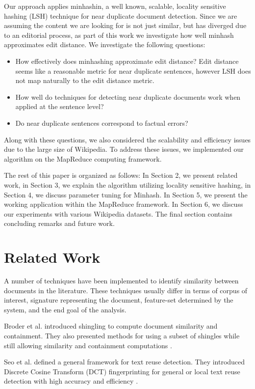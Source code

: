 \documentclass{acm_proc_article-sp}
\begin{document}
Our approach applies minhashin, a well known, scalable, locality sensitive hashing (LSH) technique for near duplicate document detection. Since we are assuming the content we are looking for is not just similar, but has diverged due to an editorial process, as part of this work we investigate how well minhash approximates edit distance.  
We investigate the following questions:
\begin{itemize}[noitemsep,nolistsep]
\item How effectively does minhashing approximate edit distance? Edit distance seems like a reasonable metric for near duplicate sentences, however LSH does not map naturally to the edit distance metric.
\item How well do techniques for detecting near duplicate documents work when applied at the sentence level?
\item Do near duplicate sentences correspond to factual errors?
\end{itemize}

Along with these questions, we also considered the scalability and efficiency issues due to the large size of Wikipedia. To address these issues, we implemented our algorithm on the MapReduce computing framework.

The rest of this paper is organized as follows: In Section 2, we present related work, in Section 3, we explain the algorithm utilizing locality sensitive hashing, in Section 4, we discuss parameter tuning for Minhash. In Section 5, we present the working application within the MapReduce framework. In Section 6, we discuss our experiments with various Wikipedia datasets. The final section contains concluding remarks and future work.

\section{Related Work}
A number of techniques have been implemented to identify similarity between documents in the literature. These techniques usually differ in terms of corpus of interest, signature representing the document, feature-set determined by the system, and the end goal of the analysis.

Broder et al. introduced shingling to compute document similarity and containment. They also presented methods for using a subset of shingles while still allowing similarity and containment computations \cite{broder:resemblance}.

Seo et al. defined a general framework for text reuse detection. They introduced Discrete Cosine Transform (DCT) fingerprinting for general or local text reuse detection with high accuracy and efficiency \cite{seo:dct}.
\end{document}

